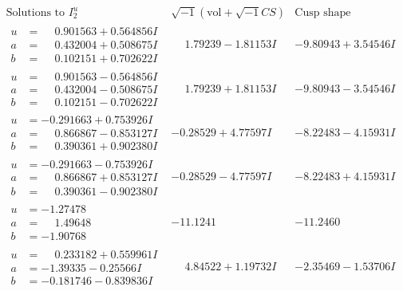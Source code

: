\documentclass[1p]{elsarticle_modified}
\theoremstyle{definition}
\newcommand{\I}{\sqrt{-1}}
\begin{document}
$$\begin{array}{c|c|c}  
\text{Solutions to }I^u_{2}& \I (\text{vol} + \sqrt{-1}CS) & \text{Cusp shape}\\
 \hline 
\begin{aligned}
u &= \phantom{-}0.901563 + 0.564856 I \\
a &= \phantom{-}0.432004 + 0.508675 I \\
b &= \phantom{-}0.102151 + 0.702622 I\end{aligned}
 & \phantom{-}1.79239 - 1.81153 I & -9.80943 + 3.54546 I \\ \hline\begin{aligned}
u &= \phantom{-}0.901563 - 0.564856 I \\
a &= \phantom{-}0.432004 - 0.508675 I \\
b &= \phantom{-}0.102151 - 0.702622 I\end{aligned}
 & \phantom{-}1.79239 + 1.81153 I & -9.80943 - 3.54546 I \\ \hline\begin{aligned}
u &= -0.291663 + 0.753926 I \\
a &= \phantom{-}0.866867 - 0.853127 I \\
b &= \phantom{-}0.390361 + 0.902380 I\end{aligned}
 & -0.28529 + 4.77597 I & -8.22483 - 4.15931 I \\ \hline\begin{aligned}
u &= -0.291663 - 0.753926 I \\
a &= \phantom{-}0.866867 + 0.853127 I \\
b &= \phantom{-}0.390361 - 0.902380 I\end{aligned}
 & -0.28529 - 4.77597 I & -8.22483 + 4.15931 I \\ \hline\begin{aligned}
u &= -1.27478\phantom{ +0.000000I} \\
a &= \phantom{-}1.49648\phantom{ +0.000000I} \\
b &= -1.90768\phantom{ +0.000000I}\end{aligned}
 & -11.1241\phantom{ +0.000000I} & -11.2460\phantom{ +0.000000I} \\ \hline\begin{aligned}
u &= \phantom{-}0.233182 + 0.559961 I \\
a &= -1.39335 - 0.25566 I \\
b &= -0.181746 - 0.839836 I\end{aligned}
 & \phantom{-}4.84522 + 1.19732 I & -2.35469 - 1.53706 I \\ \hline\begin{aligned}

\end{aligned}
\end{array}$$
\end{document}
